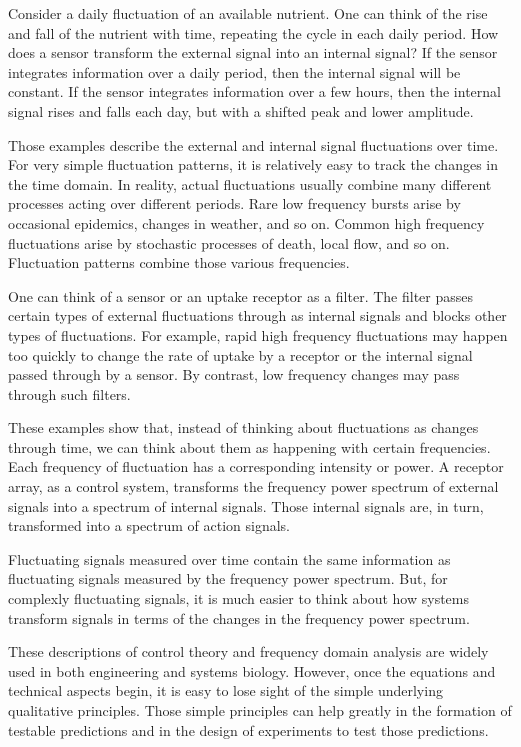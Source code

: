 \documentclass[\mydocfontsize]{article}
\begin{document}
\begin{multicols}{2}
Consider a daily fluctuation of an available nutrient. One can think of the rise and fall of the nutrient with time, repeating the cycle in each daily period. How does a sensor transform the external signal into an internal signal? If the sensor integrates information over a daily period, then the internal signal will be constant. If the sensor integrates information over a few hours, then the internal signal rises and falls each day, but with a shifted peak and lower amplitude. 

Those examples describe the external and internal signal fluctuations over time. For very simple fluctuation patterns, it is relatively easy to track the changes in the time domain. In reality, actual fluctuations usually combine many different processes acting over different periods. Rare low frequency bursts arise by occasional epidemics, changes in weather, and so on. Common high frequency fluctuations arise by stochastic processes of death, local flow, and so on. Fluctuation patterns combine those various frequencies.

One can think of a sensor or an uptake receptor as a filter. The filter passes certain types of external fluctuations through as internal signals and blocks other types of fluctuations. For example, rapid high frequency fluctuations may happen too quickly to change the rate of uptake by a receptor or the internal signal passed through by a sensor. By contrast, low frequency changes may pass through such filters. 

These examples show that, instead of thinking about fluctuations as changes through time, we can think about them as happening with certain frequencies. Each frequency of fluctuation has a corresponding intensity or power. A receptor array, as a control system, transforms the frequency power spectrum of external signals into a spectrum of internal signals. Those internal signals are, in turn, transformed into a spectrum of action signals. 

Fluctuating signals measured over time contain the same information as fluctuating signals measured by the frequency power spectrum. But, for complexly fluctuating signals, it is much easier to think about how systems transform signals in terms of the changes in the frequency power spectrum.

These descriptions of control theory and frequency domain analysis are widely used in both engineering and systems biology. However, once the equations and technical aspects begin, it is easy to lose sight of the simple underlying qualitative principles. Those simple principles can help greatly in the formation of testable predictions and in the design of experiments to test those predictions.


\end{multicols}
\end{document}
